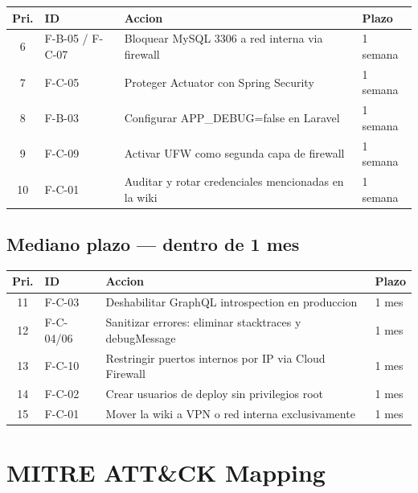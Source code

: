 \documentclass[11pt,a4paper]{article}
\begin{document}
\begin{center}
\begin{tabularx}{\textwidth}{clXl}
\toprule
\textbf{Pri.} & \textbf{ID} & \textbf{Accion} & \textbf{Plazo} \\
\midrule
6  & F-B-05 / F-C-07 & Bloquear MySQL 3306 a red interna via firewall         & 1 semana \\
7  & F-C-05            & Proteger Actuator con Spring Security                  & 1 semana \\
8  & F-B-03            & Configurar APP\_DEBUG=false en Laravel                 & 1 semana \\
9  & F-C-09            & Activar UFW como segunda capa de firewall              & 1 semana \\
10 & F-C-01            & Auditar y rotar credenciales mencionadas en la wiki    & 1 semana \\
\bottomrule
\end{tabularx}
\end{center}

\subsection*{Mediano plazo --- dentro de 1 mes}

\begin{center}
\begin{tabularx}{\textwidth}{clXl}
\toprule
\textbf{Pri.} & \textbf{ID} & \textbf{Accion} & \textbf{Plazo} \\
\midrule
11 & F-C-03      & Deshabilitar GraphQL introspection en produccion       & 1 mes \\
12 & F-C-04/06   & Sanitizar errores: eliminar stacktraces y debugMessage & 1 mes \\
13 & F-C-10      & Restringir puertos internos por IP via Cloud Firewall  & 1 mes \\
14 & F-C-02      & Crear usuarios de deploy sin privilegios root          & 1 mes \\
15 & F-C-01      & Mover la wiki a VPN o red interna exclusivamente       & 1 mes \\
\bottomrule
\end{tabularx}
\end{center}

\newpage

\section{MITRE ATT\&CK Mapping}
\end{document}
